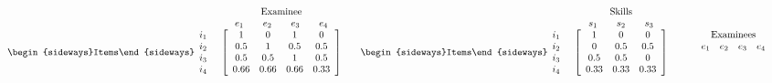 \begin{figure}
\begin{footnotesize} 
\[
\begin{array}{ccc}
\begin{array}{cc}
 & \textrm{Examinee}\\
 & \begin{array}{ccccccc}
e_{1} && e_{2} && e_{3} && e_{4}\end{array}\\
\mathrm{\begin{sideways}Items\end{sideways}}\begin{array}{c}
i_{1}\\
i_{2}\\
i_{3}\\
i_{4}
\end{array} & \left[\begin{array}{cccc}
1 & 0 & 1 & 0\\
0.5 & 1 & 0.5 & 0.5\\
0.5 & 0.5 & 1 & 0.5\\
0.66 & 0.66 & 0.66 & 0.33
\end{array}\right]
\end{array} & \begin{array}{cc}
 & \textrm{Skills}\\
 & \begin{array}{ccccc}
s_{1} & &s_{2} && s_{3}\end{array}\\
\mathrm{\begin{sideways}Items\end{sideways}}\begin{array}{c}
i_{1}\\
i_{2}\\
i_{3}\\
i_{4}
\end{array} & \left[\begin{array}{ccc}
1 & 0 & 0\\
0 & 0.5 & 0.5\\
0.5 & 0.5 & 0\\
0.33 & 0.33 & 0.33
\end{array}\right]
\end{array} & \begin{array}{cc}
 & \textrm{Examinees}\\
 & \begin{array}{cccc}
e_{1} & e_{2} & e_{3} & e_{4}\end{array}\\

\end{array}
\end{array}\]
\end{footnotesize}
\end{figure}

